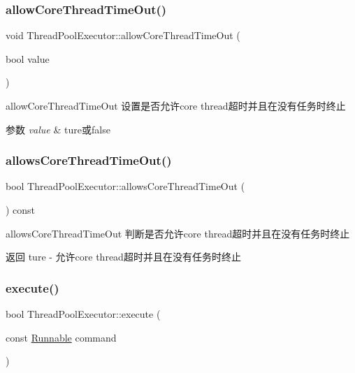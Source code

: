 \subsubsection{\texorpdfstring{allow\+Core\+Thread\+Time\+Out()}{allowCoreThreadTimeOut()}}
{\footnotesize\ttfamily void Thread\+Pool\+Executor\+::allow\+Core\+Thread\+Time\+Out (\begin{DoxyParamCaption}\item[{bool}]{value }\end{DoxyParamCaption})}



allow\+Core\+Thread\+Time\+Out 设置是否允许core thread超时并且在没有任务时终止 


\begin{DoxyParams}{参数}
{\em value} & ture或false \\
\hline
\end{DoxyParams}
\mbox{\label{classThreadPoolExecutor_acb920195bb39c64c97ed0644693a3592}} 
\subsubsection{\texorpdfstring{allows\+Core\+Thread\+Time\+Out()}{allowsCoreThreadTimeOut()}}
{\footnotesize\ttfamily bool Thread\+Pool\+Executor\+::allows\+Core\+Thread\+Time\+Out (\begin{DoxyParamCaption}{ }\end{DoxyParamCaption}) const}



allows\+Core\+Thread\+Time\+Out 判断是否允许core thread超时并且在没有任务时终止 

\begin{DoxyReturn}{返回}
ture -\/ 允许core thread超时并且在没有任务时终止 
\end{DoxyReturn}
\mbox{\label{classThreadPoolExecutor_a04e334b5d7f3b383aa01fbac80120feb}} 
\subsubsection{\texorpdfstring{execute()}{execute()}}
{\footnotesize\ttfamily bool Thread\+Pool\+Executor\+::execute (\begin{DoxyParamCaption}\item[{const \hyperlink{classRunnable}{Runnable}}]{command }\end{DoxyParamCaption})}



